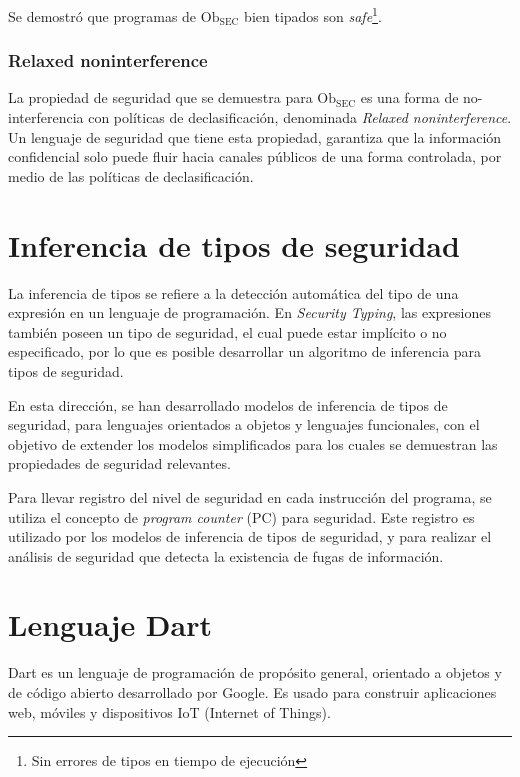 	Se demostró que programas de $\text{Ob}_{\text{SEC}}$ bien tipados son \textit{safe}\footnote{Sin errores de tipos en tiempo de ejecución}.

	\subsubsection{Relaxed noninterference}

	La propiedad de seguridad que se demuestra para $\text{Ob}_{\text{SEC}}$ es una forma de no-interferencia con políticas de declasificación, denominada \textit{Relaxed noninterference}.	Un lenguaje de seguridad que tiene esta propiedad, garantiza que la información confidencial solo puede fluir hacia canales públicos de una forma controlada, por medio de las políticas de declasificación\cite{cruzAl:ecoop2017}.

	\section{Inferencia de tipos de seguridad}

	La inferencia de tipos se refiere a la detección automática del tipo de una expresión en un lenguaje de programación. En \textit{Security Typing}, las expresiones también poseen un tipo de seguridad, el cual puede estar implícito o no especificado, por lo que es posible desarrollar un algoritmo de inferencia para tipos de seguridad.

	En esta dirección, se han desarrollado modelos de inferencia de tipos de seguridad, para lenguajes orientados a objetos\cite{SunBanerjeeGiacobazzi} y lenguajes funcionales\cite{Pottier}, con el objetivo de extender los modelos simplificados para los cuales se demuestran las propiedades de seguridad relevantes.

	Para llevar registro del nivel de seguridad en cada instrucción del programa, se utiliza el concepto de \textit{program counter} (PC) para seguridad\cite{Molnar:2005}. Este registro es utilizado por los modelos de inferencia de tipos de seguridad, y para realizar el análisis de seguridad que detecta la existencia de fugas de información.

	\section{Lenguaje Dart}

	Dart es un lenguaje de programación de propósito general, orientado a objetos y de código abierto desarrollado por Google. Es usado para construir aplicaciones web, móviles y dispositivos IoT (Internet of Things). %

